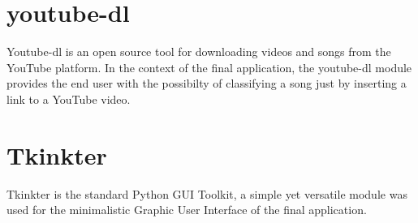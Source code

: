 \section{youtube-dl}
Youtube-dl is an open source tool for downloading videos and songs from the YouTube platform. In the
context of the final application, the youtube-dl module provides the end user with the possibilty of classifying
a song just by inserting a link to a YouTube video.

\section{Tkinkter}
Tkinkter is the standard Python GUI Toolkit, a simple yet versatile module was used for the minimalistic Graphic
User Interface of the final application.
